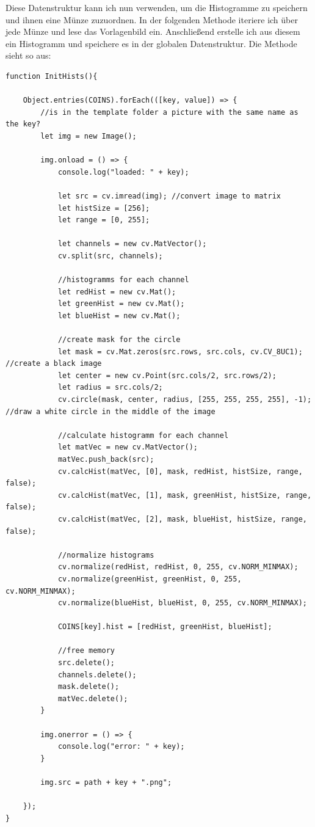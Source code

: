 Diese Datenstruktur kann ich nun verwenden, um die Histogramme zu speichern und ihnen eine Münze zuzuordnen. In der folgenden Methode iteriere ich über jede Münze und lese das Vorlagenbild ein. Anschließend erstelle ich aus diesem ein Histogramm und speichere es in der globalen Datenstruktur. Die Methode sieht so aus:

\begin{lstlisting}[style=JavaScript]
function InitHists(){

    Object.entries(COINS).forEach(([key, value]) => {
        //is in the template folder a picture with the same name as the key?
        let img = new Image();

        img.onload = () => {
            console.log("loaded: " + key);

            let src = cv.imread(img); //convert image to matrix
            let histSize = [256];
            let range = [0, 255];

            let channels = new cv.MatVector();
            cv.split(src, channels);

            //histogramms for each channel
            let redHist = new cv.Mat();
            let greenHist = new cv.Mat();
            let blueHist = new cv.Mat();

            //create mask for the circle
            let mask = cv.Mat.zeros(src.rows, src.cols, cv.CV_8UC1); //create a black image
            let center = new cv.Point(src.cols/2, src.rows/2);
            let radius = src.cols/2;
            cv.circle(mask, center, radius, [255, 255, 255, 255], -1); //draw a white circle in the middle of the image

            //calculate histogramm for each channel
            let matVec = new cv.MatVector();
            matVec.push_back(src);
            cv.calcHist(matVec, [0], mask, redHist, histSize, range, false);
            cv.calcHist(matVec, [1], mask, greenHist, histSize, range, false);
            cv.calcHist(matVec, [2], mask, blueHist, histSize, range, false);

            //normalize histograms
            cv.normalize(redHist, redHist, 0, 255, cv.NORM_MINMAX);
            cv.normalize(greenHist, greenHist, 0, 255, cv.NORM_MINMAX);
            cv.normalize(blueHist, blueHist, 0, 255, cv.NORM_MINMAX);

            COINS[key].hist = [redHist, greenHist, blueHist];

            //free memory
            src.delete();
            channels.delete();
            mask.delete();
            matVec.delete();
        }

        img.onerror = () => {
            console.log("error: " + key);
        }

        img.src = path + key + ".png";

    });
}
\end{lstlisting}

